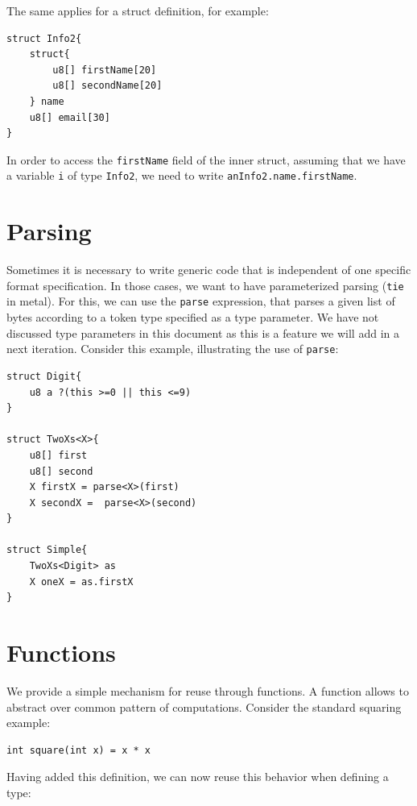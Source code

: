 \documentclass[10pt,oneside]{article}
\begin{document}
The same applies for a struct definition, for example:

\begin{verbatim}
struct Info2{
    struct{
        u8[] firstName[20]
        u8[] secondName[20]
    } name
    u8[] email[30]
}
\end{verbatim}

In order to access the \texttt{firstName} field of the inner struct,
assuming that we have a variable \texttt{i} of type \texttt{Info2}, we
need to write \texttt{anInfo2.name.firstName}.

\hypertarget{parsing}{%
\section{Parsing}\label{parsing}}

Sometimes it is necessary to write generic code that is independent of
one specific format specification. In those cases, we want to have
parameterized parsing (\texttt{tie} in metal). For this, we can use the
\texttt{parse} expression, that parses a given list of bytes according
to a token type specified as a type parameter. We have not discussed
type parameters in this document as this is a feature we will add in a
next iteration. Consider this example, illustrating the use of
\texttt{parse}:

\begin{verbatim}
struct Digit{
    u8 a ?(this >=0 || this <=9)
}

struct TwoXs<X>{
    u8[] first
    u8[] second
    X firstX = parse<X>(first)
    X secondX =  parse<X>(second)
}

struct Simple{
    TwoXs<Digit> as
    X oneX = as.firstX
}
\end{verbatim}

\hypertarget{functions}{%
\section{Functions}\label{functions}}

We provide a simple mechanism for reuse through functions. A function
allows to abstract over common pattern of computations. Consider the
standard squaring example:

\begin{verbatim}
int square(int x) = x * x
\end{verbatim}

Having added this definition, we can now reuse this behavior when
defining a type:
\end{document}
